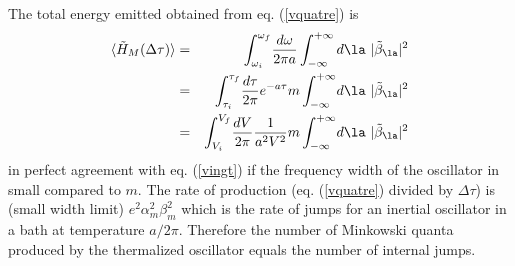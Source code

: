 The total energy emitted obtained from eq. (\ref{vquatre}) is
\begin{eqnarray}
\bk{\tilde H_M( \Delta \tau)}  &=&  \int_{ \omega_i}^{ \omega_f}  \! { d
\omega \over 2 \pi a} \int_{-\infty}^{+\infty}  d\la\ | \tilde
\beta_{\la}|^2
\nonumber\\
&=& \int_{ \tau_i}^{ \tau_f}  \! { d \tau \over 2 \pi}
e^{-a\tau}
m \int_{-\infty}^{+\infty} \! d\la\ | \tilde
\beta_{\la}|^2
\nonumber\\ &=& \int_{V_i}^{V_f}  \! {d V \over 2 \pi}  {1 \over a^2V^2} m
\int_{-\infty}^{+\infty} \! d\la\ |
\tilde
\beta_{\la}|^2
\label{vcinq}
\end{eqnarray}
in perfect agreement with eq. (\ref{vingt}) if the frequency width
of the oscillator in small compared to $ m$.
The rate of production (eq. (\ref{vquatre}) divided by $ \Delta \tau$) is
(small width limit) ${e^2} \alpha _{m}^2
\beta_{m}^2$ which is the rate of jumps for an inertial
oscillator in a bath at temperature $a/2 \pi$. Therefore the number of
Minkowski quanta
produced by the thermalized oscillator equals the number of internal jumps.


